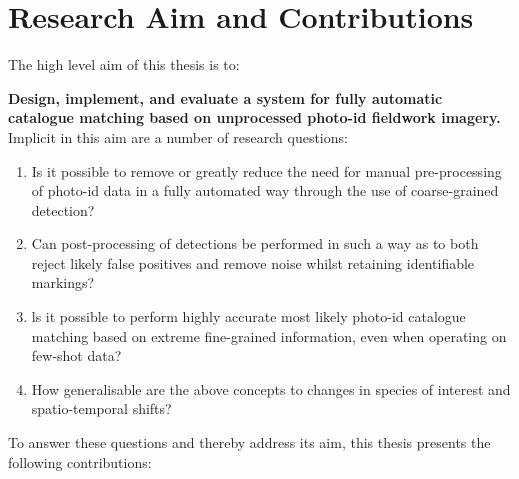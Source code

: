 \section{Research Aim and Contributions}\label{ch:intro,sec:AimsAndContributions}

The high level aim of this thesis is to:

\begin{flushleft}
	\textbf{Design, implement, and evaluate a system for fully automatic catalogue matching based on unprocessed photo-id fieldwork imagery.}
	\bigbreak\noindent Implicit in this aim are a number of research questions:
\end{flushleft}

\begin{enumerate}
	\item Is it possible to remove or greatly reduce the need for manual pre-processing of photo-id data in a fully automated way through the use of coarse-grained detection?
	\item Can post-processing of detections be performed in such a way as to both reject likely false positives and remove noise whilst retaining identifiable markings?
	\item ls it possible to perform highly accurate most likely photo-id catalogue matching based on extreme fine-grained information, even when operating on few-shot data?
	\item How generalisable are the above concepts to changes in species of interest and spatio-temporal shifts?
\end{enumerate}

\noindent To answer these questions and thereby address its aim, this thesis presents the following contributions:

